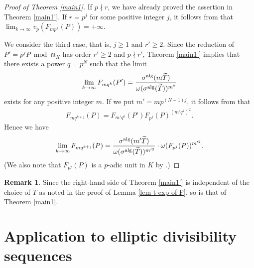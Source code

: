 \documentclass[11pt]{amsart}
\theoremstyle{definition}
\newtheorem{rmk}[thm]{Remark}
\begin{document}
\begin{proof}[Proof of Theorem \ref{main1}]
If $p \nmid r$, we have already proved the assertion in Theorem \ref{main1'}. If $r=p^j$ for some positive integer $j$, it follows from \cite[Theorem 6.1]{St16} that $\lim_{k \to \infty}v_p(F_{mp^k}(P))=+\infty$.

We consider the third case, that is, $j \geq 1$ and $r' \geq 2$. Since the reduction of $P'=p^jP \bmod \mathfrak{m}_K$ has order $r' \geq 2$ and $p \nmid r'$, Theorem \ref{main1'} implies that there exists a power $q=p^N$ such that the limit
%
\begin{align*}
\lim_{k\to \infty} F_{mq^k} (P')=\frac{\sigma^{\rm alg}(m\widetilde{T})}{\omega(\sigma^{\rm alg}(\widetilde{T}))^{m^2}}
\end{align*}
%
exists for any positive integer $m$. If we put $m'=mp^{(N-1)j}$, it follows from \cite[Appendix I, Proposition 2]{MT91} that
%
\begin{align*}
F_{m q^{k+j}} (P)=F_{m'q^k} (P')F_{p^j}(P)^{(m'q^k)^2}.
\end{align*}
%
Hence we have
%
\begin{align*}
\lim_{k\to \infty} F_{mq^{k+j}} (P)=\frac{\sigma^{\rm alg}(m'\widetilde{T})}{\omega(\sigma^{\rm alg}(\widetilde{T}))^{m'^2}} \cdot \omega (F_{p^j}(P))^{m'^2}.
\end{align*}
%
(We also note that $F_{p^j}(P)$ is a $p$-adic unit in $K$ by \cite[Theorem 6.1]{St16}.)
%
%
\end{proof}




\begin{rmk}\label{depends only on T}
Since the right-hand side of Theorem \ref{main1'} is independent of the choice of $\widetilde{T}$ as noted in the proof of  Lemma \ref{lem t-exp of F}, so is that of Theorem \ref{main1}.
\end{rmk}


\section{Application to elliptic divisibility sequences}
\end{document}
